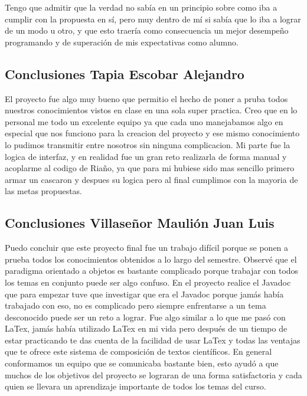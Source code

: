 \documentclass{article}
\begin{document}
Tengo que admitir que la verdad no sabía en un principio sobre como iba a cumplir con la propuesta en sí, pero muy dentro de mí si sabía que lo iba a lograr de un modo u otro, y que esto traería como consecuencia un mejor desempeño programando y de superación de mis expectativas como alumno.

\subsection{Conclusiones Tapia Escobar Alejandro}

El proyecto fue algo muy bueno que permitio el hecho de poner a pruba todos
nuestros conocimientos vistos en clase en una sola super practica. Creo que en lo
personal me todo un excelente equipo ya que cada uno manejabamos algo en
especial que nos funciono para la creacion del proyecto y ese mismo conocimiento
lo pudimos transmitir entre nosotros sin ninguna complicacion. Mi parte fue la
logica de interfaz, y en realidad fue un gran reto realizarla de forma manual y
acoplarme al codigo de Riaño, ya que para mi hubiese sido mas sencillo primero
armar un cascaron y despues su logica pero al final cumplimos con la mayoria de
las metas propuestas.

\subsection{Conclusiones Villaseñor Maulión Juan Luis}

Puedo concluir que este proyecto final fue un trabajo difícil porque se ponen a prueba todos los conocimientos obtenidos a lo largo del semestre. Observé que el paradigma orientado a objetos es bastante complicado porque trabajar con todos los temas en conjunto puede ser algo confuso. 
En el proyecto realice el Javadoc que para empezar tuve que investigar que era el Javadoc porque jamás había trabajado con eso, no es complicado pero siempre enfrentarse a un tema desconocido puede ser un reto a lograr. Fue algo similar a lo que me pasó con LaTex, jamás había utilizado LaTex en mi vida pero después de un tiempo de estar practicando te das cuenta de la facilidad de usar LaTex y todas las ventajas que te ofrece este sistema de composición de textos científicos.
En general conformamos un equipo que se comunicaba bastante bien, esto ayudó a que muchos de los objetivos del proyecto se lograran de una forma satisfactoria y cada quien se llevara un aprendizaje importante de todos los temas del curso. 
\end{document}
